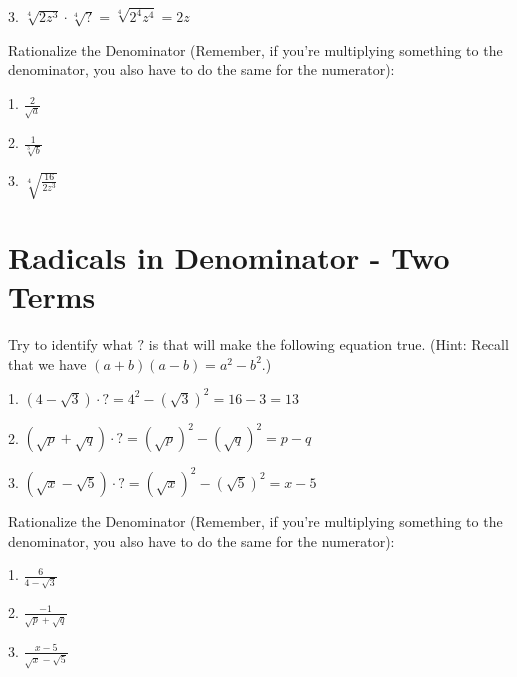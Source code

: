 \documentclass[12pt]{article}
\begin{document}
3. $\sqrt[4]{2z^{3}}\cdot \sqrt[4]{?}=\sqrt[4]{2^{4}z^{4}}=2z$ 

\vspace{4.5em} 

\noindent Rationalize the Denominator (Remember, if you're multiplying something to the denominator, you also have to do the same for the numerator): 

\vspace{1.5em} 

1. $\frac{2}{\sqrt{a}} $ 

\vspace{4.5em} 

2. $\frac{1}{\sqrt[3]{b}} $ 

\vspace{4.5em} 

3. $\sqrt[4]{\frac{16}{2z^{3}}}$

\vspace{4.5em} 

\section{Radicals in Denominator - Two Terms}
Try to identify what $?$ is that will make the following equation true. (Hint: Recall that we have $(a+b)(a-b)=a^{2}-b^{2}$.)

\vspace{1.5em} 

1. $(4-\sqrt{3})\cdot ?=4^{2}-(\sqrt{3})^{2}=16-3=13$ 

\vspace{4.5em} 

2. $(\sqrt{p}+\sqrt{q})\cdot ?=(\sqrt{p})^{2}-(\sqrt{q})^{2}=p-q$ 

\vspace{4.5em} 

3. $(\sqrt{x}-\sqrt{5})\cdot ?=(\sqrt{x})^{2}-(\sqrt{5})^{2}=x-5$ 

\vspace{4.5em} 
\noindent Rationalize the Denominator (Remember, if you're multiplying something to the denominator, you also have to do the same for the numerator): 

\vspace{1.5em} 

1. $\frac{6}{4-\sqrt{3}}  $ 

\vspace{4.5em} 

2. $\frac{-1}{\sqrt{p}+\sqrt{q}} $ 

\vspace{4.5em} 

3. $\frac{x-5}{\sqrt{x}-\sqrt{5}} $


\vspace{4.5em} 
\end{document}
